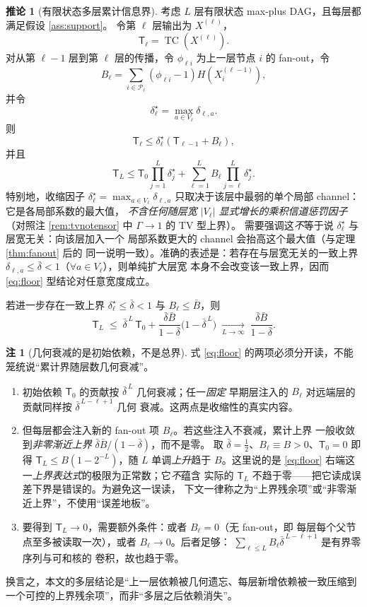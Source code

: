 \documentclass[a4paper,11pt]{article}
\theoremstyle{definition}
\newtheorem{corollary}{推论}
\newtheorem{remark}{注}
\newcommand{\1}{\mathbf 1}
\newcommand{\TC}{\operatorname{TC}}
\newcommand{\Pset}{\mathcal P}
\newcommand{\TCs}{\mathsf T}
\begin{document}
\begin{corollary}[有限状态多层累计信息界]
\label{cor:multilayer}
考虑 $L$ 层有限状态 max-plus DAG，且每层都满足假设 \ref{ass:support}。
令第 $\ell$ 层输出为 $X^{(\ell)}$，
\[
\TCs_\ell=\TC(X^{(\ell)}).
\]
对从第 $\ell-1$ 层到第 $\ell$ 层的传播，令
$\phi_{\ell i}$ 为上一层节点 $i$ 的 fan-out，令
\[
B_\ell
=
\sum_{i\in\Pset_\ell}
(\phi_{\ell i}-1)H(X_i^{(\ell-1)}),
\]
并令
\[
\delta^\star_\ell
=
\max_{a\in V_\ell}\delta_{\ell,a}.
\]
则
\[
\TCs_\ell
\le
\delta^\star_\ell(\TCs_{\ell-1}+B_\ell),
\]
并且
\[
\TCs_L
\le
\TCs_0\prod_{j=1}^{L}\delta^\star_j
+
\sum_{\ell=1}^{L}
B_\ell
\prod_{j=\ell}^{L}\delta^\star_j.
\]
特别地，收缩因子 $\delta^\star_\ell=\max_{a\in V_\ell}\delta_{\ell,a}$
只取决于该层中最弱的单个局部 channel：它是各局部系数的最大值，
\emph{不含任何随层宽 $|V_\ell|$ 显式增长的乘积信道惩罚因子}
（对照注 \ref{rem:tvnotensor} 中 $\Gamma\to1$ 的 TV 型上界）。
需要强调这\emph{不}等于说 $\delta^\star_\ell$ 与层宽无关：向该层加入一个
局部系数更大的 channel 会抬高这个最大值（与定理 \ref{thm:fanout} 后的
同一说明一致）。准确的表述是：若存在与层宽无关的一致上界
$\delta_{\ell,a}\le\bar\delta<1$（$\forall a\in V_\ell$），则单纯扩大层宽
本身不会改变该一致上界，因而 \eqref{eq:floor} 型结论对任意宽度成立。

若进一步存在一致上界 $\delta^\star_\ell\le\bar\delta<1$ 与
$B_\ell\le\bar B$，则
\begin{equation}
\label{eq:floor}
\TCs_L
\;\le\;
\bar\delta^{\,L}\,\TCs_0
+
\frac{\bar\delta\bar B}{1-\bar\delta}\bigl(1-\bar\delta^{\,L}\bigr)
\;\xrightarrow[L\to\infty]{}\;
\frac{\bar\delta\bar B}{1-\bar\delta} .
\end{equation}
\end{corollary}

\begin{remark}[几何衰减的是初始依赖，不是总界]
\label{rem:floor}
式 \eqref{eq:floor} 的两项必须分开读，不能笼统说“累计界随层数几何衰减”。
\begin{enumerate}[label=(\arabic*)]
\item 初始依赖 $\TCs_0$ 的贡献按 $\bar\delta^{\,L}$ 几何衰减；任一\emph{固定}
早期层注入的 $B_\ell$ 对远端层的贡献同样按 $\bar\delta^{\,L-\ell+1}$ 几何
衰减。这两点是收缩性的真实内容。
\item 但每层都会注入新的 fan-out 项 $B_\ell$。若这些注入不衰减，累计上界
一般收敛到\emph{非零渐近上界} $\bar\delta\bar B/(1-\bar\delta)$，而不是零。
取 $\bar\delta=\frac12$、$B_\ell\equiv B>0$、$\TCs_0=0$ 即得
$\TCs_L\le B(1-2^{-L})$，随 $L$ 单调\emph{上升}趋于 $B$。这里说的是
\eqref{eq:floor} 右端这一\emph{上界表达式}的极限为正常数；它\emph{不}蕴含
实际的 $\TCs_L$ 不趋于零——把它读成误差下界是错误的。为避免这一误读，
下文一律称之为“上界残余项”或“非零渐近上界”，不使用“误差地板”。
\item 要得到 $\TCs_L\to0$，需要额外条件：或者 $B_\ell=0$（无 fan-out，即
每层每个父节点至多被读取一次），或者 $B_\ell\to0$。后者足够：
$\sum_{\ell\le L}B_\ell\bar\delta^{\,L-\ell+1}$ 是有界零序列与可和核的
卷积，故也趋于零。
\end{enumerate}
换言之，本文的多层结论是“上一层依赖被几何遗忘、每层新增依赖被一致压缩到
一个可控的上界残余项”，而非“多层之后依赖消失”。
\end{remark}
\end{document}
